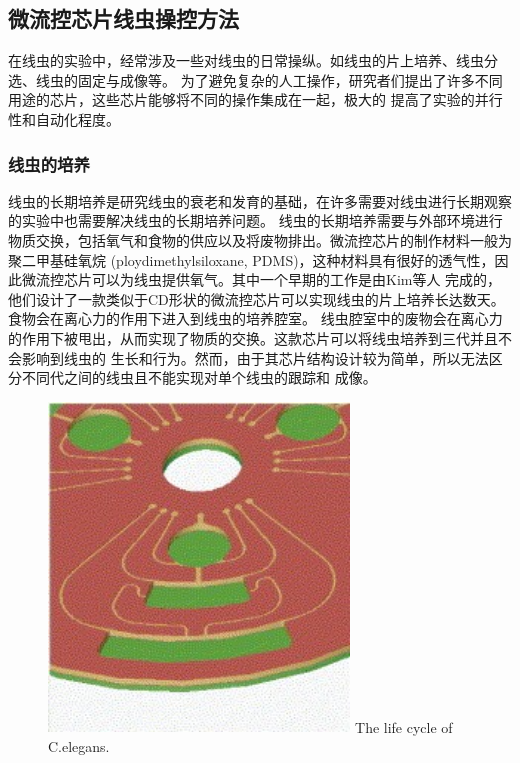 \subsection{微流控芯片线虫操控方法}
	在线虫的实验中，经常涉及一些对线虫的日常操纵。如线虫的片上培养、线虫分选、线虫的固定与成像等。
	为了避免复杂的人工操作，研究者们提出了许多不同用途的芯片，这些芯片能够将不同的操作集成在一起，极大的
	提高了实验的并行性和自动化程度。
	
\subsubsection{线虫的培养}
\label{sec:intro:analog}
	线虫的长期培养是研究线虫的衰老和发育的基础，在许多需要对线虫进行长期观察的实验中也需要解决线虫的长期培养问题。
	线虫的长期培养需要与外部环境进行物质交换，包括氧气和食物的供应以及将废物排出。微流控芯片的制作材料一般为聚二甲基硅氧烷
	(ploydimethylsiloxane, PDMS)，这种材料具有很好的透气性，因此微流控芯片可以为线虫提供氧气。其中一个早期的工作是由Kim等人\cite{Kim2007Automated}
	完成的，他们设计了一款类似于CD形状的微流控芯片可以实现线虫的片上培养长达数天。食物会在离心力的作用下进入到线虫的培养腔室。
	线虫腔室中的废物会在离心力的作用下被甩出，从而实现了物质的交换。这款芯片可以将线虫培养到三代并且不会影响到线虫的
	生长和行为。然而，由于其芯片结构设计较为简单，所以无法区分不同代之间的线虫且不能实现对单个线虫的跟踪和
	成像。
	\begin{figure}[h]
	  \centering
	  \includegraphics[width=8cm]{figure/chap1/cd.jpg}
		{The life cycle of C.elegans.}
	  \label{fig:cd}
	\end{figure}
	

